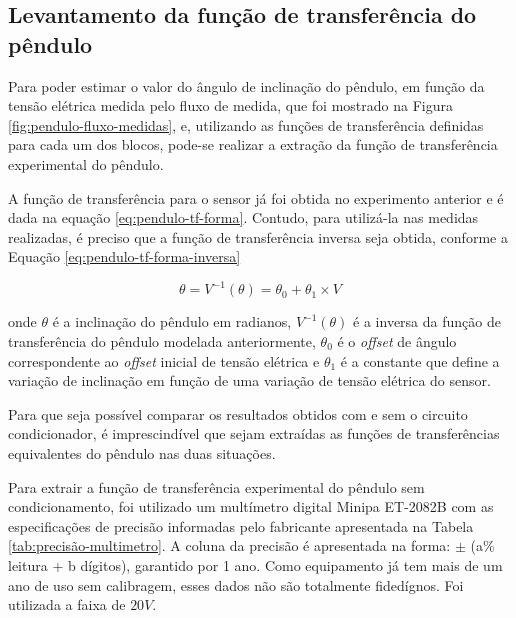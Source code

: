 \documentclass[a4paper]{instrumentacao}
\begin{document}
\subsection{Levantamento da função de transferência do pêndulo}

Para poder estimar o valor do ângulo de inclinação do pêndulo, em função da tensão elétrica medida pelo fluxo de medida, que foi mostrado na Figura \ref{fig:pendulo-fluxo-medidas}, e, utilizando as funções de transferência definidas para cada um dos blocos, pode-se realizar a extração da função de transferência experimental do pêndulo.

A função de transferência para o sensor já foi obtida no experimento anterior e é dada na equação \ref{eq:pendulo-tf-forma}. Contudo, para utilizá-la nas medidas realizadas, é preciso que a função de transferência inversa seja obtida, conforme a Equação \ref{eq:pendulo-tf-forma-inversa}

\begin{equation}
	\theta = V^{-1}(\theta) = \theta_0 + \theta_1 \times V
	\label{eq:pendulo-tf-forma-inversa}
\end{equation}

onde $\theta$ é a inclinação do pêndulo em radianos, $V^{-1}(\theta)$ é a inversa da função de transferência do pêndulo modelada anteriormente, $\theta_0$ é o \textit{offset} de ângulo correspondente ao \textit{offset} inicial de tensão elétrica e $\theta_1$ é a constante que define a variação de inclinação em função de uma variação de tensão elétrica do sensor.

Para que seja possível comparar os resultados obtidos com e sem o circuito condicionador, é imprescindível que sejam extraídas as funções de transferências equivalentes do pêndulo nas duas situações.

Para extrair a função de transferência experimental do pêndulo sem condicionamento, foi utilizado um multímetro digital Minipa ET-2082B com as especificações de precisão informadas pelo fabricante apresentada na Tabela \ref{tab:precisão-multimetro}. A coluna da precisão é apresentada na forma: $\pm$ (a$\%$ leitura + b dígitos), garantido por 1 ano. Como equipamento já tem mais de um ano de uso sem calibragem, esses dados não são totalmente fidedígnos. Foi utilizada a faixa de $20 V$.
\end{document}
